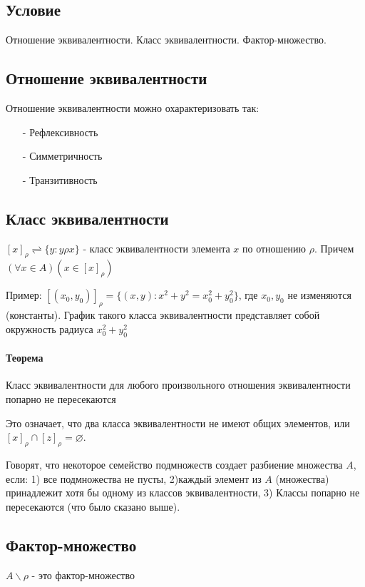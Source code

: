 \documentclass{report}
\begin{document}
\subsection{Условие}
Отношение эквивалентности. Класс эквивалентности. Фактор-множество.

\subsection{Отношение эквивалентности}
Отношение эквивалентности можно охарактеризовать так:
\begin{itemize}
    \item[-] Рефлексивность
    \item[-] Симметричность
    \item[-] Транзитивность
\end{itemize}

\subsection{Класс эквивалентности}
$[x]_{\rho} \rightleftharpoons \{y: y\rho x\}$ - класс эквивалентности элемента $x$ по отношению $\rho$.
Причем $(\forall x \in A)(x \in [x]_{\rho})$

Пример: $[(x_{0},y_{0})]_{\rho} = \{(x,y): x^{2} + y^{2} = x_{0}^{2} + y_{0}^{2}\}$, где $x_{0}, y_{0}$ не изменяются (константы).
График такого класса эквивалентности представляет собой окружность радиуса $x_{0}^{2} + y_{0}^{2}$

\paragraph{Теорема}
Класс эквивалентности для любого произвольного отношения эквивалентности попарно не пересекаются

Это означает, что два класса эквивалентности не имеют общих элементов, или
$[x]_{\rho} \cap [z]_{\rho} = \varnothing$.

Говорят, что некоторое семейство подмножеств создает разбиение множества $A$, если:
1) все подмножества не пусты,
2)каждый элемент из $A$ (множества) принадлежит хотя бы одному из классов эквивалентности,
3) Классы попарно не пересекаются (что было сказано выше).

\subsection{Фактор-множество}
$A\backslash\rho$ - это фактор-множество
\end{document}
